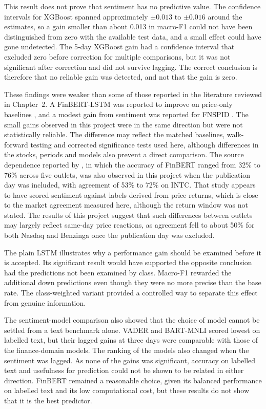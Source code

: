 This result does not prove that sentiment has no predictive value. The confidence intervals for XGBoost spanned approximately $\pm 0.013$ to $\pm 0.016$ around the estimates, so a gain smaller than about 0.013 in macro-F1 could not have been distinguished from zero with the available test data, and a small effect could have gone undetected. The 5-day XGBoost gain had a confidence interval that excluded zero before correction for multiple comparisons, but it was not significant after correction and did not survive lagging. The correct conclusion is therefore that no reliable gain was detected, and not that the gain is zero.

These findings were weaker than some of those reported in the literature reviewed in Chapter~2. A FinBERT-LSTM was reported to improve on price-only baselines \parencite{gu2024predicting}, and a modest gain from sentiment was reported for FNSPID \parencite{dong2024fnspid}. The small gains observed in this project were in the same direction but were not statistically reliable. The difference may reflect the matched baselines, walk-forward testing and corrected significance tests used here, although differences in the stocks, periods and models also prevent a direct comparison. The source dependence reported by \textcite{liu2025enhancing}, in which the accuracy of FinBERT ranged from 32\% to 76\% across five outlets, was also observed in this project when the publication day was included, with agreement of 53\% to 72\% on INTC. That study appears to have scored sentiment against labels derived from price returns, which is close to the market agreement measured here, although the return window was not stated. The results of this project suggest that such differences between outlets may largely reflect same-day price reactions, as agreement fell to about 50\% for both Nasdaq and Benzinga once the publication day was excluded.

The plain LSTM illustrates why a performance gain should be examined before it is accepted. Its significant result would have supported the opposite conclusion had the predictions not been examined by class. Macro-F1 rewarded the additional down predictions even though they were no more precise than the base rate. The class-weighted variant provided a controlled way to separate this effect from genuine information.

The sentiment-model comparison also showed that the choice of model cannot be settled from a text benchmark alone. VADER and BART-MNLI scored lowest on labelled text, but their lagged gains at three days were comparable with those of the finance-domain models. The ranking of the models also changed when the sentiment was lagged. As none of the gains was significant, accuracy on labelled text and usefulness for prediction could not be shown to be related in either direction. FinBERT remained a reasonable choice, given its balanced performance on labelled text and its low computational cost, but these results do not show that it is the best predictor.

